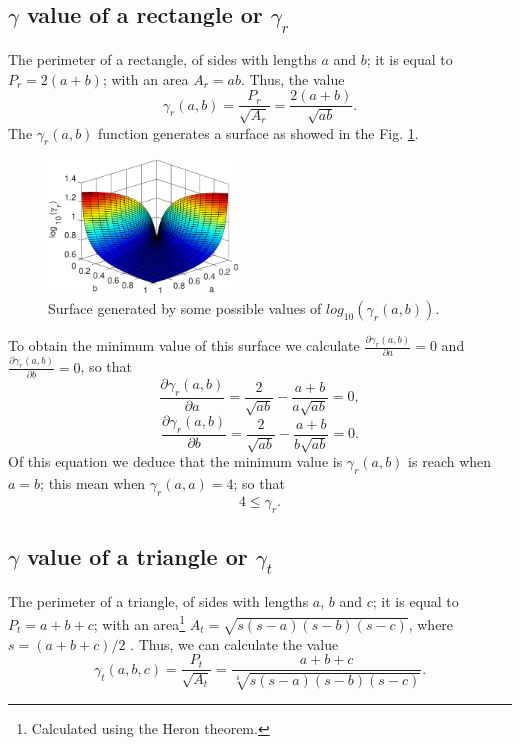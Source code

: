 \subsection{$\gamma$ value of a rectangle or $\gamma_r$}
\label{subsec:gammar}
The perimeter of a rectangle, of sides with lengths  $a$ and $b$; 
it is equal to $P_r=2 (a+b)$; 
 with an area $A_r=ab$. Thus, the value
\begin{equation}
\gamma_r(a,b)=\frac{P_r}{\sqrt{A_r}}=\frac{2(a+b)}{\sqrt{ab}}.
\end{equation}
The $\gamma_r(a,b)$ function generates a surface as showed in the Fig. \ref{fig:section1-gammar}.
\begin{figure}[h!]
\centering
\includegraphics[width=0.45\textwidth]{section1-gammar.eps}
\caption{Surface generated by some possible values of $log_{10}(\gamma_r(a,b))$.}
\label{fig:section1-gammar}
\end{figure}
To obtain the minimum value of this surface we calculate $\frac{\partial \gamma_r(a,b)}{\partial a}=0$
and $\frac{\partial \gamma_r(a,b)}{\partial b}=0$, so that
\begin{equation}
\frac{\partial \gamma_r(a,b)}{\partial a}=\frac{2}{\sqrt{ab}}-\frac{a+b}{a\sqrt{ab}}=0,
\end{equation}
\begin{equation}
\frac{\partial \gamma_r(a,b)}{\partial b}=\frac{2}{\sqrt{ab}}-\frac{a+b}{b\sqrt{ab}}=0.
\end{equation}
Of this equation we deduce that the minimum value is $\gamma_r(a,b)$ is reach when $a=b$;
this mean when $\gamma_r(a,a)=4$; so that
\begin{equation}
4 \leq \gamma_r.
\end{equation}

\subsection{$\gamma$ value of a triangle or $\gamma_t$}

The perimeter of a triangle, of sides with lengths  $a$, $b$ and $c$; 
it is equal to $P_t=a+b+c$; 
 with an area\footnote{Calculated using the Heron theorem.} $A_t=\sqrt{s(s-a)(s-b)(s-c)}$,
where $s=(a+b+c)/2$ \cite[pp. 253]{sterling2013algebra}. 
Thus, we can calculate the value
\begin{equation}
\gamma_t(a,b,c)=\frac{P_t}{\sqrt{A_t}}=\frac{a+b+c}{\sqrt[4]{s(s-a)(s-b)(s-c)}}.
\end{equation}

